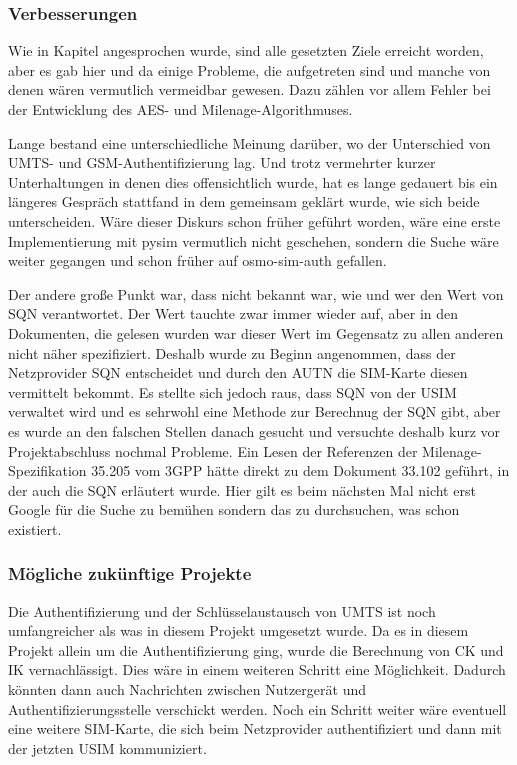 		\subsubsection{Verbesserungen}
		Wie in Kapitel  angesprochen wurde, sind alle gesetzten
		Ziele erreicht worden, aber es gab hier und da einige Probleme, die aufgetreten
		sind und manche von denen wären vermutlich vermeidbar gewesen. Dazu zählen vor
		allem Fehler bei der Entwicklung des AES- und Milenage-Algorithmuses.
		
		Lange bestand eine unterschiedliche Meinung darüber, wo der Unterschied von UMTS-
		und GSM-Authentifizierung lag. Und trotz vermehrter kurzer Unterhaltungen in
		denen dies offensichtlich wurde, hat es lange gedauert bis ein längeres Gespräch
		stattfand in dem gemeinsam geklärt wurde, wie sich beide unterscheiden. Wäre
		dieser Diskurs schon früher geführt worden, wäre eine erste Implementierung mit
		pysim vermutlich nicht geschehen, sondern die Suche wäre weiter gegangen und
		schon früher auf osmo-sim-auth gefallen.
		
		Der andere große Punkt war, dass nicht bekannt war, wie und wer den Wert von SQN
		verantwortet. Der Wert tauchte zwar immer wieder auf, aber in den Dokumenten,
		die gelesen wurden war dieser Wert im Gegensatz zu allen anderen nicht näher
		spezifiziert. Deshalb wurde zu Beginn angenommen, dass der Netzprovider SQN
		entscheidet und durch den AUTN die SIM-Karte diesen vermittelt bekommt. Es
		stellte sich jedoch raus, dass SQN von der USIM verwaltet wird und es sehrwohl
		eine Methode zur Berechnug der SQN gibt, aber es wurde an den falschen Stellen
		danach gesucht und versuchte deshalb kurz vor Projektabschluss nochmal Probleme.
		Ein Lesen der Referenzen der Milenage-Spezifikation 35.205 vom 3GPP hätte direkt
		zu dem Dokument 33.102 geführt, in der auch die SQN erläutert wurde. Hier gilt
		es beim nächsten Mal nicht erst Google für die Suche zu bemühen sondern das zu
		durchsuchen, was schon existiert.
		
		\subsubsection{Mögliche zukünftige Projekte}
		Die Authentifizierung und der Schlüsselaustausch von UMTS ist noch umfangreicher
		als was in diesem Projekt umgesetzt wurde. Da es in diesem Projekt allein um die
		Authentifizierung ging, wurde die Berechnung von CK und IK vernachlässigt. Dies
		wäre in einem weiteren Schritt eine Möglichkeit. Dadurch könnten dann auch
		Nachrichten zwischen Nutzergerät und Authentifizierungsstelle verschickt werden.
		Noch ein Schritt weiter wäre eventuell eine weitere SIM-Karte, die sich beim
		Netzprovider authentifiziert und dann mit der jetzten USIM kommuniziert.

